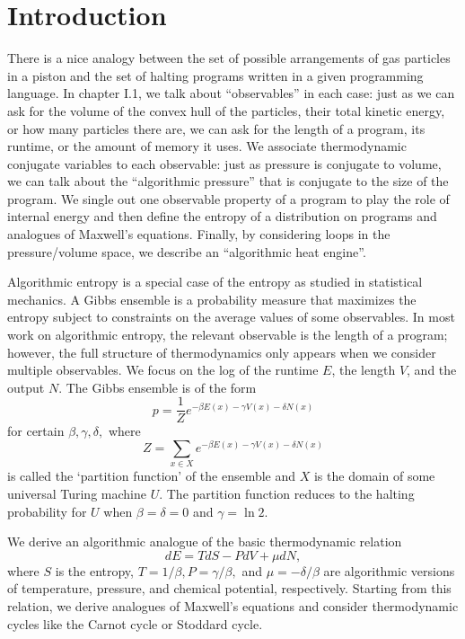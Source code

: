 \documentclass[12pt,twoside,openright]{report}
\begin{document}
\renewcommand{\thepage}{\arabic{page}}
\setcounter{page}{1}
\chapter*{Introduction}

There is a nice analogy between the set of possible arrangements of gas particles in a piston and the set of halting programs written in a given programming language.  In chapter I.1, we talk about ``observables'' in each case: just as we can ask for the volume of the convex hull of the particles, their total kinetic energy, or how many particles there are, we can ask for the length of a program, its runtime, or the amount of memory it uses.  We associate thermodynamic conjugate variables to each observable: just as pressure is conjugate to volume, we can talk about the ``algorithmic pressure'' that is conjugate to the size of the program.  We single out one observable property of a program to play the role of internal energy and then define the entropy of a distribution on programs and analogues of Maxwell's equations.  Finally, by considering loops in the pressure/volume space, we describe an ``algorithmic heat engine''.

Algorithmic entropy is a special case of the entropy as studied in statistical mechanics.  A Gibbs ensemble is a probability measure that maximizes the entropy subject to constraints on the average values of some observables.  In most work on algorithmic entropy, the relevant observable is the length of a program; however, the full structure of thermodynamics only appears when we consider multiple observables.  We focus on the log of the runtime $E$, the length $V$, and the output $N$.  The Gibbs ensemble is of the form
\[ p = \frac{1}{Z} e^{-\beta E(x) - \gamma V(x) - \delta N(x)} \]
for certain $\beta, \gamma, \delta,$ where
\[ Z = \sum_{x \in X} e^{-\beta E(x) - \gamma V(x) - \delta N(x)} \]
is called the `partition function' of the ensemble and $X$ is the domain of some universal Turing machine $U$.  The partition function reduces to the halting probability for $U$ when $\beta = \delta = 0$ and $\gamma = \ln 2$.

We derive an algorithmic analogue of the basic thermodynamic relation
\[ dE = TdS - PdV + μdN, \]
where $S$ is the entropy, $T = 1/\beta, P = \gamma/\beta,$ and $\mu = -\delta/\beta$ are algorithmic versions of temperature, pressure, and chemical potential, respectively.  Starting from this relation, we derive analogues of Maxwell's equations and consider thermodynamic cycles like the Carnot cycle or Stoddard cycle.
\end{document}
